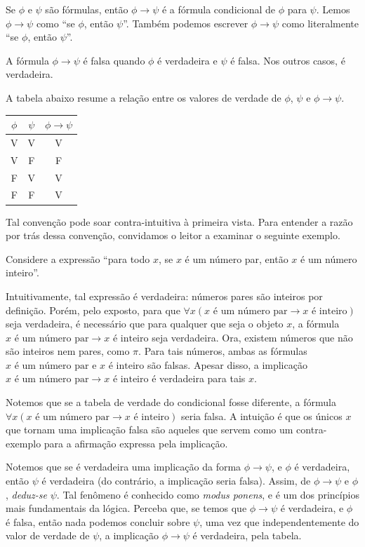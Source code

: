 Se $\phi$ e $\psi$ são fórmulas, então $\phi\to \psi$ é a fórmula condicional de $\phi$ para $\psi$.
Lemos $\phi\to \psi$ como ``se $\phi$, então $\psi$''.
Também podemos escrever $\phi\to \psi$ como literalmente ``se $\phi$, então $\psi$''.

A fórmula $\phi\to \psi$ é falsa quando $\phi$ é verdadeira e $\psi$ é falsa.
Nos outros casos, é verdadeira.

A tabela abaixo resume a relação entre os valores de verdade de $\phi$, $\psi$ e $\phi\to \psi$.

\begin{center}
    \begin{tabular}{cc|c}
        $\phi$ & $\psi$ & $\phi\to \psi$ \\
        \hline
        V & V & V \\
        V & F & F \\
        F & V & V \\
        F & F & V
    \end{tabular}
\end{center}

Tal convenção pode soar contra-intuitiva à primeira vista.
Para entender a razão por trás dessa convenção, convidamos o leitor a examinar o seguinte exemplo.
\begin{example}
    Considere a expressão ``para todo $x$, se $x$ é um número par, então $x$ é um número inteiro''.

    Intuitivamente, tal expressão é verdadeira: números pares são inteiros por definição.
    Porém, pelo exposto, para que $\forall x (x \text{ é um número par} \to x \text{ é inteiro})$ seja verdadeira, é necessário que para qualquer que seja o objeto $x$, a fórmula $x \text{ é um número par} \to x \text{ é inteiro}$ seja verdadeira.
    Ora, existem números que não são inteiros nem pares, como $\pi$.
    Para tais números, ambas as fórmulas $x \text{ é um número par}$ e $x \text{ é inteiro}$ são falsas.
    Apesar disso, a implicação $x \text{ é um número par} \to x \text{ é inteiro}$ é verdadeira para tais $x$.

    Notemos que se a tabela de verdade do condicional fosse diferente, a fórmula $\forall x (x \text{ é um número par} \to x \text{ é inteiro})$ seria falsa.
    A intuição é que os únicos $x$ que tornam uma implicação falsa são aqueles que servem como um contra-exemplo para a afirmação expressa pela implicação.
\end{example}

Notemos que se é verdadeira uma implicação da forma $\phi\to \psi$, e $\phi$ é verdadeira, então $\psi$ é verdadeira (do contrário, a implicação seria falsa).
Assim, de $\phi\to \psi$ e $\phi$, \emph{deduz-se} $\psi$.
Tal fenômeno é conhecido como \emph{modus ponens}, e é um dos princípios mais fundamentais da lógica.
Perceba que, se temos que $\phi\to \psi$ é verdadeira, e $\phi$ é falsa, então nada podemos concluir sobre $\psi$, uma vez que independentemente do valor de verdade de $\psi$, a implicação $\phi\to \psi$ é verdadeira, pela tabela.

